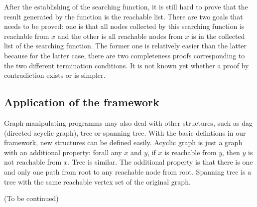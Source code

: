 After the establishing of the searching function, it is still hard to
prove that the result generated by the function is the reachable
list. There are two goals that needs to be proved: one is that all
nodes collected by this searching function is reachable from $x$ and
the other is all reachable nodes from $x$ is in the
collected list of the searching function. The former one is relatively
easier than the latter because for the latter case, there are two
completeness proofs corresponding to the two different termination
conditions. It is not known yet whether a proof by contradiction
exists or is simpler.

\subsection{Application of the framework}

Graph-manipulating programms may also deal with other structures, such
as dag (directed acyclic graph), tree or spanning tree. With the basic
defintions in our framework, new structures can be defined
easily. Acyclic graph is just a graph with an additional property:
forall any $x$ and $y$, if $x$ is reachable from $y$, then $y$ is not
reachable from $x$. Tree is similar. The additional property is that
there is one and only one path from root to any reachable node from
root. Spanning tree is a tree with the same reachable vertex set of
the original graph.

(To be continued)
